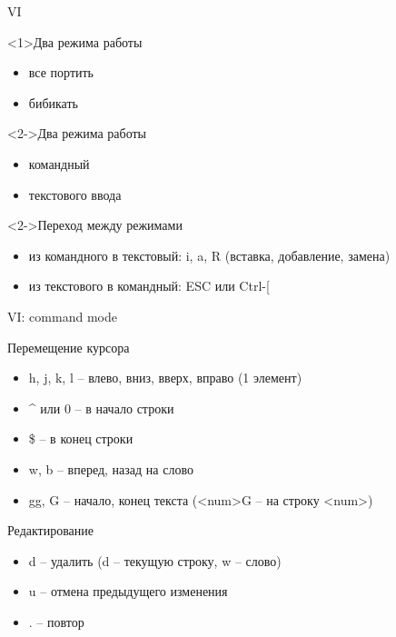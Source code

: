 \documentclass[ignorenonframetext, professionalfonts, hyperref={pdftex, unicode}]{beamer}
\begin{document}
\begin{frame}{VI}
	\begin{block}{Два режима работы}
		\begin{itemize}
			\item все портить
			\item бибикать
		\end{itemize}
	\end{block}
	\pause
	\begin{block}<2->{Два режима работы}
		\begin{itemize}
			\item командный 
			\item текстового ввода
		\end{itemize}
	\end{block}

	\begin{block}<2->{Переход между режимами}
		\begin{itemize}
			\item из командного в текстовый: i, a, R (вставка, добавление, замена)
			\item из текстового в командный: ESC или Ctrl-[
		\end{itemize}
	\end{block}

\end{frame}

\begin{frame}{VI: command mode}

	\begin{block}{Перемещение курсора}
		\begin{itemize}
			\item h, j, k, l -- влево, вниз, вверх, вправо (1 элемент)
			\item \^{} или 0 -- в начало строки
			\item \$ -- в конец строки
			\item w, b -- вперед, назад на слово
			\item gg, G -- начало, конец текста (<num>G -- на строку <num>)
		\end{itemize}
	\end{block}

	\begin{block}{Редактирование}
		\begin{itemize}
			\item d -- удалить (d -- текущую строку, w -- слово)
			\item u -- отмена предыдущего изменения
			\item . -- повтор
		\end{itemize}
	\end{block}
\end{frame}
\end{document}

